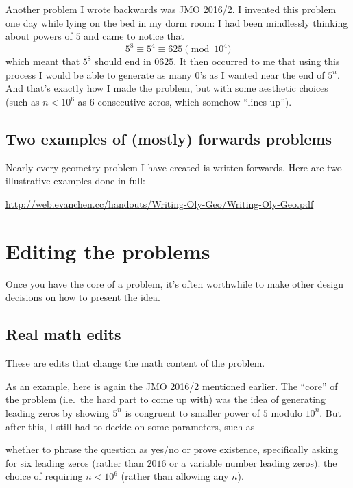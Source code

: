 \documentclass[11pt]{scrartcl}
\theoremstyle{inlined}
\begin{document}
Another problem I wrote backwards was JMO 2016/2.
I invented this problem one day while lying
on the bed in my dorm room: I had been mindlessly
thinking about powers of $5$ and came to notice that
\[ 5^8 \equiv 5^4 \equiv 625 \pmod{10^4} \]
which meant that $5^8$ should end in $0625$.
It then occurred to me that using this process I would
be able to generate as many $0$'s as I wanted near the end of $5^n$.
And that's exactly how I made the problem,
but with some aesthetic choices (such as $n < 10^6$
as $6$ consecutive zeros, which somehow ``lines up'').

\subsection{Two examples of (mostly) forwards problems}
Nearly every geometry problem I have created is written forwards.
Here are two illustrative examples done in full:
\begin{center}
   \url{http://web.evanchen.cc/handouts/Writing-Oly-Geo/Writing-Oly-Geo.pdf}
\end{center}


\section{Editing the problems}
Once you have the core of a problem,
it's often worthwhile to make other design decisions
on how to present the idea.

\subsection{Real math edits}
These are edits that change the math content of the problem.

As an example, here is again the JMO 2016/2 mentioned earlier.
The ``core'' of the problem (i.e.\ the hard part to come up with)
was the idea of generating leading zeros
by showing $5^n$ is congruent to smaller power of $5$ modulo $10^n$.
But after this, I still had to decide on some parameters, such as
\begin{itemize}
   \ii whether to phrase the question as yes/no or prove existence,
   \ii specifically asking for six leading zeros
   (rather than $2016$ or a variable number leading zeros).
   \ii the choice of requiring $n < 10^6$
   (rather than allowing any $n$).
\end{itemize}
\end{document}
